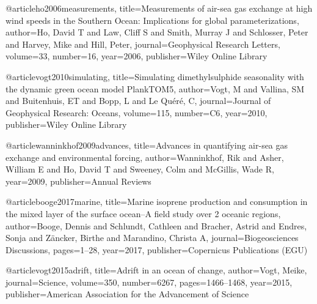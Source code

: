 @article{ho2006measurements,
  title={Measurements of air-sea gas exchange at high wind speeds in the Southern Ocean: Implications for global parameterizations},
  author={Ho, David T and Law, Cliff S and Smith, Murray J and Schlosser, Peter and Harvey, Mike and Hill, Peter},
  journal={Geophysical Research Letters},
  volume={33},
  number={16},
  year={2006},
  publisher={Wiley Online Library}
}

@article{vogt2010simulating,
  title={Simulating dimethylsulphide seasonality with the dynamic green ocean model PlankTOM5},
  author={Vogt, M and Vallina, SM and Buitenhuis, ET and Bopp, L and Le Qu{\'e}r{\'e}, C},
  journal={Journal of Geophysical Research: Oceans},
  volume={115},
  number={C6},
  year={2010},
  publisher={Wiley Online Library}
}

@article{wanninkhof2009advances,
  title={Advances in quantifying air-sea gas exchange and environmental forcing},
  author={Wanninkhof, Rik and Asher, William E and Ho, David T and Sweeney, Colm and McGillis, Wade R},
  year={2009},
  publisher={Annual Reviews}
}

@article{booge2017marine,
  title={Marine isoprene production and consumption in the mixed layer of the surface ocean--A field study over 2 oceanic regions},
  author={Booge, Dennis and Schlundt, Cathleen and Bracher, Astrid and Endres, Sonja and Z{\"a}ncker, Birthe and Marandino, Christa A},
  journal={Biogeosciences Discussions},
  pages={1--28},
  year={2017},
  publisher={Copernicus Publications (EGU)}
}

@article{vogt2015adrift,
  title={Adrift in an ocean of change},
  author={Vogt, Meike},
  journal={Science},
  volume={350},
  number={6267},
  pages={1466--1468},
  year={2015},
  publisher={American Association for the Advancement of Science}
}

